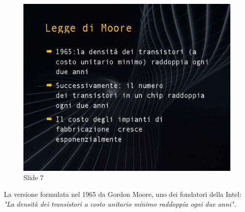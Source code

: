 \begin{figure}[ht]
    \centering
    \includegraphics[width=0.6\linewidth]{images/Lez01_p02_fig_01.png}
    \caption{Slide 7}
    \label{fig:slide_7}
\end{figure}

La versione formulata nel 1965 da Gordon Moore, uno dei fondatori della Intel: \textit{"La densità dei transistori a costo unitario minimo raddoppia ogni due anni".}

